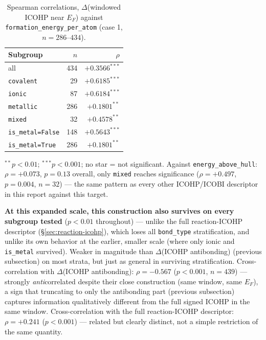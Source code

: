 \documentclass[11pt,a4paper]{article}
\begin{document}
\begin{table}[htbp]
\centering
\caption{Spearman correlations, $\Delta$(windowed ICOHP near $E_F$) against \texttt{formation\_energy\_per\_atom} (case 1, $n=286$--$434$).}
\label{tab:reaction-icohp-windowed}
\begin{tabular}{@{}lrr@{}}
\toprule
Subgroup & $n$ & $\rho$ \\
\midrule
all                 & 434 & $+0.3566^{***}$ \\
\texttt{covalent}   & 29  & $+0.6185^{***}$ \\
\texttt{ionic}      & 87  & $+0.6184^{***}$ \\
\texttt{metallic}   & 286 & $+0.1801^{**}$ \\
\texttt{mixed}      & 32  & $+0.4578^{**}$ \\
\texttt{is\_metal=False} & 148 & $+0.5643^{***}$ \\
\texttt{is\_metal=True}  & 286 & $+0.1801^{**}$ \\
\bottomrule
\end{tabular}

\vspace{0.15cm}
{\footnotesize $^{**}p<0.01$; $^{***}p<0.001$; no star = not
significant. Against \texttt{energy\_above\_hull}: $\rho=+0.073$,
$p=0.13$ overall, only \texttt{mixed} reaches significance
($\rho=+0.497$, $p=0.004$, $n=32$) --- the same pattern as every other
ICOHP/ICOBI descriptor in this report against this target.}
\end{table}

\textbf{At this expanded scale, this construction also survives on
every subgroup tested} ($p<0.01$ throughout) --- unlike the full
reaction-ICOHP descriptor (\S\ref{sec:reaction-icohp}), which loses all
\texttt{bond\_type} stratification, and unlike its own behavior at the
earlier, smaller scale (where only ionic and \texttt{is\_metal}
survived). Weaker in magnitude than $\Delta$(ICOHP antibonding)
(previous subsection) on most strata, but just as general in
surviving stratification. Cross-correlation with $\Delta$(ICOHP
antibonding): $\rho=-0.567$ ($p<0.001$, $n=439$) --- strongly
\emph{anti}correlated despite their close construction (same window,
same $E_F$), a sign that truncating to only the antibonding part
(previous subsection) captures information qualitatively different
from the full signed ICOHP in the same window. Cross-correlation with
the full reaction-ICOHP descriptor: $\rho=+0.241$ ($p<0.001$) ---
related but clearly distinct, not a simple restriction of the same
quantity.
\end{document}
